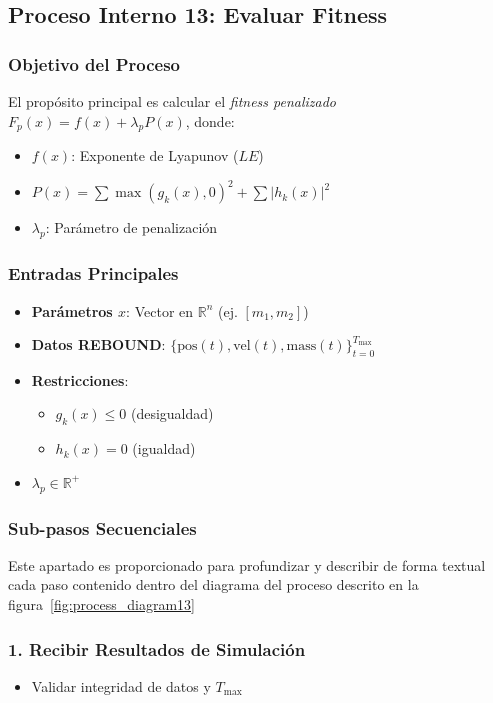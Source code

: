 \subsection{Proceso Interno 13: Evaluar Fitness}

\subsubsection{Objetivo del Proceso}
El propósito principal es calcular el \textit{fitness penalizado} $F_p(x) = f(x) + \lambda_p P(x)$, donde:
\begin{itemize}
    \item $f(x)$: Exponente de Lyapunov ($LE$)
    \item $P(x) = \sum {\max(g_k(x), 0)}^2 + \sum |h_k(x)|^2$
    \item $\lambda_p$: Parámetro de penalización
\end{itemize}

\subsubsection{Entradas Principales}
\begin{itemize}
    \item \textbf{Parámetros $x$}: Vector en $\mathbb{R}^n$ (ej. $[m_1, m_2]$)
    \item \textbf{Datos REBOUND}: ${\{\text{pos}(t), \text{vel}(t), \text{mass}(t)\}}_{t=0}^{T_{\max}}$
    \item \textbf{Restricciones}:
    \begin{itemize}
        \item $g_k(x) \leq 0$ (desigualdad)
        \item $h_k(x) = 0$ (igualdad)
    \end{itemize}
    \item $\lambda_p \in \mathbb{R}^+$
\end{itemize}

\subsubsection{Sub-pasos Secuenciales}
Este apartado es proporcionado para profundizar y describir de forma textual cada paso contenido dentro del diagrama del proceso descrito en la figura~\ref{fig:process_diagram13}
\subsubsection*{1. Recibir Resultados de Simulación}
\begin{itemize}
    \item Validar integridad de datos y $T_{\max}$
\end{itemize}

